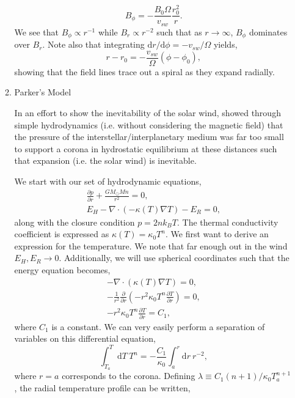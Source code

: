 \begin{enumerate}
\begin{enumerate}
				\begin{equation}
					B_{\phi} = -\frac{B_0\Omega}{v_{sw}}\frac{r_0^2}{r}.
				\end{equation}
				We see that $B_{\phi}\propto r^{-1}$ while $B_r\propto r^{-2}$ such that as $r\to\infty$, $B_\phi$ dominates over $B_r$. Note also that integrating $\mathrm{d}r/\mathrm{d}\phi=-v_{sw}/\Omega$ yields,
				\begin{equation}
					r - r_0 = -\frac{v_{sw}}{\Omega}(\phi - \phi_0),
				\end{equation}
				showing that the field lines trace out a spiral as they expand radially.
				\item{Parker's Model}
				\par In an effort to show the inevitability of the solar wind, \citet{parker_dynamics_1958} showed through simple hydrodynamics (i.e. without considering the magnetic field) that the pressure of the interstellar/interplanetary medium was far too small to support a corona in hydrostatic equilibrium at these distances such that expansion (i.e. the solar wind) is inevitable. 
				\par We start with our set of hydrodynamic equations,
				\begin{align}
					\frac{\partial p}{\partial r} + \frac{GM_{\odot}Mn}{r^2} = 0, \\
					E_H - \nabla\cdot(-\kappa(T)\nabla T) - E_R = 0,
				\end{align}
				along with the closure condition $p=2nk_BT$. The thermal conductivity coefficient is expressed as $\kappa(T) = \kappa_0T^n$. We first want to derive an expression for the temperature. We note that far enough out in the wind $E_H,E_R\to 0$. Additionally, we will use spherical coordinates such that the energy equation becomes,
				\begin{align}
					-\nabla\cdot(\kappa(T)\nabla T) = 0, \\
					-\frac{1}{r^2}\frac{\partial}{\partial r}\left(-r^2\kappa_0T^n\frac{\partial T}{\partial r}\right) = 0, \\
					-r^2\kappa_0T^n\frac{\partial T}{\partial r} = C_1,
				\end{align}
				where $C_1$ is a constant. We can very easily perform a separation of variables on this differential equation,
				\begin{equation}
					\int^T_{T_a}\mathrm{d}T~T^n = -\frac{C_1}{\kappa_0}\int^r_a\mathrm{d}r~r^{-2},
				\end{equation}
				where $r=a$ corresponds to the corona. Defining $\lambda\equiv C_1(n+1)/\kappa_0T_a^{n+1}$, the radial temperature profile can be written,

\end{enumerate}
\end{enumerate}
